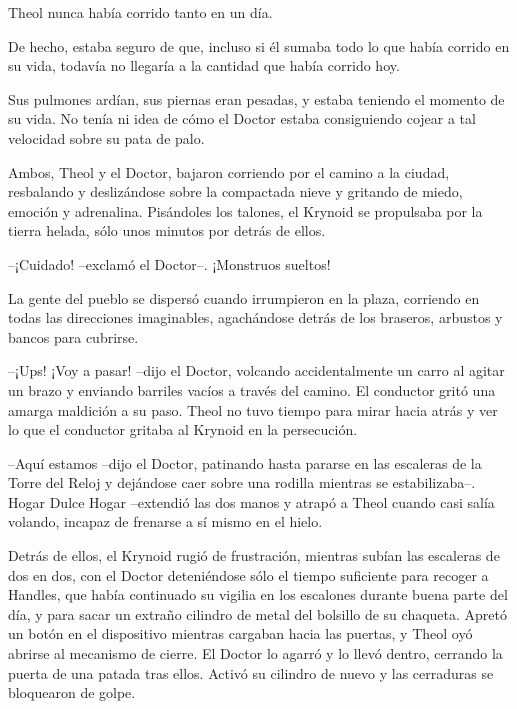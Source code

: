 Theol nunca había corrido tanto en un día.



De hecho, estaba seguro de que, incluso si él sumaba todo lo que había corrido en su vida, todavía no llegaría a la cantidad que había corrido hoy.



Sus pulmones ardían, sus piernas eran pesadas, y estaba teniendo el momento de su vida. No tenía ni idea de cómo el Doctor estaba consiguiendo cojear a tal velocidad sobre su pata de palo.



Ambos, Theol y el Doctor, bajaron corriendo por el camino a la ciudad, resbalando y deslizándose sobre la compactada nieve y gritando de miedo, emoción y adrenalina. Pisándoles los talones, el Krynoid se propulsaba por la tierra helada, sólo unos minutos por detrás de ellos.



--¡Cuidado! --exclamó el Doctor--. ¡Monstruos sueltos!



La gente del pueblo se dispersó cuando irrumpieron en la plaza, corriendo en todas las direcciones imaginables, agachándose detrás de los braseros, arbustos y bancos para cubrirse.



--¡Ups! ¡Voy a pasar! --dijo el Doctor, volcando accidentalmente un carro al agitar un brazo y enviando barriles vacíos a través del camino. El conductor gritó una amarga maldición a su paso. Theol no tuvo tiempo para mirar hacia atrás y ver lo que el conductor gritaba al Krynoid en la persecución.



--Aquí estamos --dijo el Doctor, patinando hasta pararse en las escaleras de la Torre del Reloj y dejándose caer sobre una rodilla mientras se estabilizaba--. Hogar Dulce Hogar --extendió las dos manos y atrapó a Theol cuando casi salía volando, incapaz de frenarse a sí mismo en el hielo.



Detrás de ellos, el Krynoid rugió de frustración, mientras subían las escaleras de dos en dos, con el Doctor deteniéndose sólo el tiempo suficiente para recoger a Handles, que había continuado su vigilia en los escalones durante buena parte del día, y para sacar un extraño cilindro de metal del bolsillo de su chaqueta. Apretó un botón en el dispositivo mientras cargaban hacia las puertas, y Theol oyó abrirse al mecanismo de cierre. El Doctor lo agarró y lo llevó dentro, cerrando la puerta de una patada tras ellos. Activó su cilindro de nuevo y las cerraduras se bloquearon de golpe.



